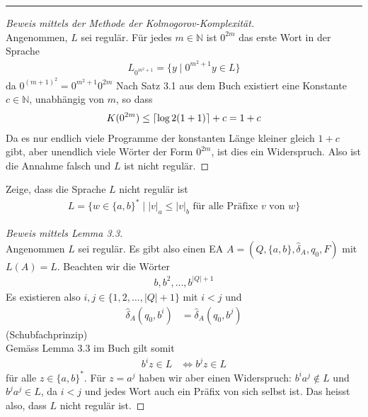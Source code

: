 \documentclass[a4paper,ngerman,12pt]{exam}
\DeclarePairedDelimiter\ceil{\lceil}{\rceil}
\begin{document}
\begin{questions}
\begin{solutionorbox}[22em]
      \hrule

      \begin{proof}[Beweis mittels der Methode der Kolmogorov-Komplexität] $ $\\
        Angenommen, $L$ sei regulär. Für jedes $m \in \mathbb{N}$ ist $0^{2m}$
  das erste Wort in der Sprache
  \begin{align*}
    L_{0^{m^2+1}} = \{y \mid 0^{m^2+1}y \in L\}
  \end{align*}
        da $0^{(m+1)^2} = 0^{m^2+1}0^{2m}$
Nach Satz 3.1 aus dem Buch existiert eine Konstante $c \in \mathbb{N}$,
unabhängig von $m$, so dass
  \begin{align*}
    K(0^{2m}) \leq \ceil{\log 2 (1 + 1)} + c = 1 + c
  \end{align*}
Da es nur endlich viele Programme der konstanten Länge kleiner gleich $1 + c$ gibt, aber unendlich
viele Wörter der Form $0^{2m}$, ist dies ein Widerspruch. Also ist die Annahme falsch
und $L$ ist nicht regulär.
      \end{proof}
    \end{solutionorbox}

    \question
    Zeige, dass die Sprache $L$ nicht regulär ist
    \begin{align*}
      L = \{w \in \{a, b\}^* \mid |v|_a \leq |v|_b \text{ für alle Präfixe } v
      \text{ von } w\}
    \end{align*}
     \vspace{-2em}
    \begin{solutionorbox}[22em]
      \begin{proof}[Beweis mittels Lemma 3.3] $ $\\
    Angenommen $L$ sei regulär.
    Es gibt also einen EA $A = (Q, \{a, b\}, \hat{\delta}_A, q_0, F)$ mit $L(A) = L$.
    Beachten wir die Wörter
    \begin{align*}
      b, b^2, \dots , b^{|Q|+1}
    \end{align*}
    Es existieren also $i, j \in \{1, 2, \dots, |Q|+1\}$ mit $i < j$
    und
    \begin{align*}
      \hat{\delta}_A(q_0, b^{i}) &= \hat{\delta}_A(q_0, b^{j})
    \end{align*}
    (Schubfachprinzip)\\
    Gemäss Lemma 3.3 im Buch gilt somit
    \begin{align*}
      b^{i} z \in L &\iff b^{j} z \in L
    \end{align*}
    für alle $z \in \{a, b\}^*$. Für $z = a^{j}$ haben wir aber einen Widerspruch:
        $b^{i} a^{j} \not \in L$ und $b^{j} a^{j} \in L$,
        da $i < j$ und jedes Wort auch ein Präfix von sich selbst ist.
        Das heisst also, dass
    $L$ nicht regulär ist.
      \end{proof}


\end{solutionorbox}
\end{questions}
\end{document}
